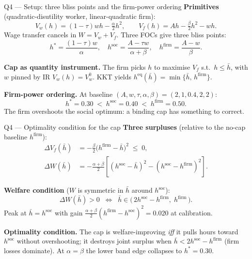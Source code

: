 \documentclass{beamer}
\begin{document}
\begin{frame}{Q4 --- Setup: three bliss points and the firm-power ordering}
\textbf{Primitives} (quadratic-disutility worker, linear-quadratic firm):
\[
V_w(h)=(1\!-\!\tau)wh-\tfrac{\alpha}{2}h^{2},\qquad V_f(h)=Ah-\tfrac{\beta}{2}h^{2}-wh.
\]
Wage transfer cancels in $W\!=\!V_w\!+\!V_f$. Three FOCs give three bliss points:
\[
h^{*}=\frac{(1\!-\!\tau)w}{\alpha},\quad
h^{\mathrm{soc}}=\frac{A-\tau w}{\alpha+\beta},\quad
h^{\mathrm{firm}}=\frac{A-w}{\beta}.
\]

\textbf{Cap as quantity instrument.} The firm picks $h$ to maximise $V_f$ s.t.\ $h\!\le\!\bar h$, with $w$ pinned by IR $V_w(h)\!=\!V_w^{0}$. KKT yields $h^{\mathrm{eq}}(\bar h)\!=\!\min\{\bar h,\,h^{\mathrm{firm}}\}$.

\vspace{0.3em}
\textbf{Firm-power ordering.} At baseline $(A,w,\tau,\alpha,\beta)\!=\!(2,1,0.4,2,2)$:
\[
h^{*}=0.30\;<\;h^{\mathrm{soc}}=0.40\;<\;h^{\mathrm{firm}}=0.50.
\]
The firm overshoots the social optimum: a binding cap has something to correct.
\end{frame}

\begin{frame}{Q4 --- Optimality condition for the cap}
\textbf{Three surpluses} (relative to the no-cap baseline $h^{\mathrm{firm}}$):
\begin{align*}
\Delta V_f(\bar h) &= -\tfrac{\beta}{2}\bigl(h^{\mathrm{firm}}-\bar h\bigr)^{2}\;\le\;0, \\
\Delta W(\bar h)   &= -\tfrac{\alpha+\beta}{2}\!\left[(h^{\mathrm{soc}}-\bar h)^{2}-(h^{\mathrm{soc}}-h^{\mathrm{firm}})^{2}\right].
\end{align*}

\textbf{Welfare condition} ($W$ is symmetric in $\bar h$ around $h^{\mathrm{soc}}$):
\[
\Delta W(\bar h)>0\;\;\Longleftrightarrow\;\;\bar h\in\bigl(\,2h^{\mathrm{soc}}-h^{\mathrm{firm}},\;h^{\mathrm{firm}}\,\bigr).
\]
Peak at $\bar h=h^{\mathrm{soc}}$ with gain $\tfrac{\alpha+\beta}{2}(h^{\mathrm{firm}}-h^{\mathrm{soc}})^{2}=0.020$ at calibration.

\vspace{0.3em}
\textbf{Optimality condition.} The cap is welfare-improving \emph{iff} it pulls hours toward $h^{\mathrm{soc}}$ without overshooting; it destroys joint surplus when $\bar h<2h^{\mathrm{soc}}-h^{\mathrm{firm}}$ (firm losses dominate). At $\alpha\!=\!\beta$ the lower band edge collapses to $h^{*}\!=\!0.30$.
\end{frame}
\end{document}
